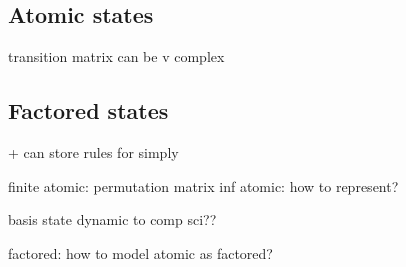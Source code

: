 
\subsection{Atomic states}

transition matrix can be v complex

\subsection{Factored states}
+ can store rules for simply

finite atomic: permutation matrix
inf atomic: how to represent?

basis state dynamic to comp sci??

factored: how to model atomic as factored?

